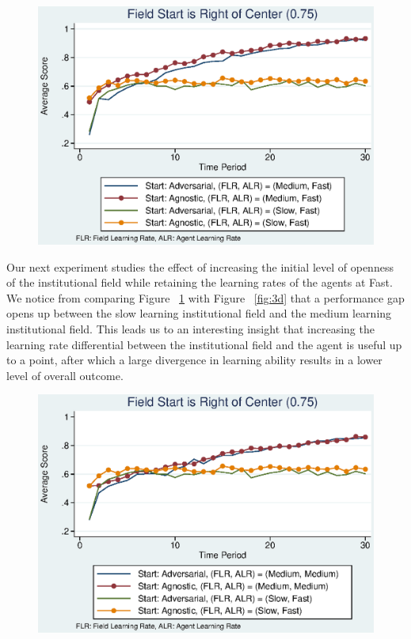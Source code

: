 \documentclass[12pt,letterpaper]{article}
\begin{document}
\begin{figure}[h]
\begin{centering}
  \caption{}
  \includegraphics[width=\textwidth]{frcmedium3e}
  \label{fig:3e}
\end{centering}
\end{figure}

Our next experiment studies the effect of increasing the initial level of openness of the institutional field while retaining the learning rates of the agents at \textquotesingle Fast\textquotesingle . We notice from comparing Figure ~\ref{fig:3e} with Figure ~\ref{fig:3d} that a performance gap opens up between the slow learning institutional field and the medium learning institutional field. This leads us to an interesting insight that increasing the learning rate differential between the institutional field and the agent is useful up to a point, after which a large divergence in learning ability results in a lower level of overall outcome.
\begin{figure}[h]
\begin{centering}
  \caption{}
  \includegraphics[width=\textwidth]{frcmedium3f}
  \label{fig:3f}
\end{centering}
\end{figure}
\end{document}
